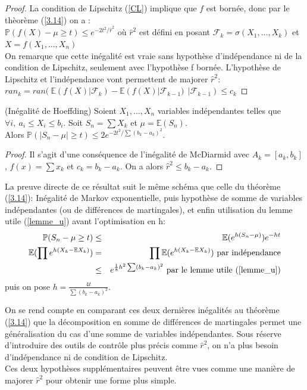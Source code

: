 \begin{proof} La condition de Lipschitz (\ref{CL}) implique que $f$ est bornée, donc par le thèorème (\ref{3.14}) on a :\\
$\mathbb{P}(f(X)-\mu \geq t) \leq e^{-2t^2/\hat r^2}$ où $\hat r^2$ est défini en posant $\mathcal{F}_k=\sigma(X_1,...,X_k)$ et $X=f(X_1,...,X_n)$\\
On remarque que cette inégalité est vraie sans hypothèse d'indépendance ni de la condition de Lipschitz, seulement avec l'hypothèse f bornée. L'hypothèse de Lipschitz et l'indépendance vont permettent de majorer $\hat r^2$:\\
$ran_k=ran(~\mathbb{E}(f(X)|\mathcal{F}_k)-\mathbb{E}(f(X)|\mathcal{F}_{k-1})~~|\mathcal{F}_{k-1}) \leq c_k$

\end{proof}


\begin{theorem} (Inégalité de Hoeffding)
Soient $X_1,...,X_n$ variables indépendantes telles que $\forall i, ~ a_i \leq X_i \leq b_i$. Soit $S_n=\sum X_k$ et $\mu=\mathbb{E}(S_n)$.\\
Alors $\mathbb{P}(|S_n-\mu| \geq t) \leq 2e^{-2t^2/\sum(b_k-a_k)^2} $.
\end{theorem}

\begin{proof}
 Il s'agit d'une conséquence de l'inégalité de McDiarmid avec $ A_k=[a_k,b_k]$, $f(x)=\sum x_k$ et $c_k=b_k-a_k $. On a alors $\hat r^2 \leq b_k-a_k$.
\end{proof}

\begin{remark} 
 La preuve directe de ce résultat suit le même schéma que celle du théorème (\ref{3.14}): Inégalité de Markov exponentielle, puis hypothèse de somme de variables indépendantes (ou de différences de martingales), et enfin utilisation du lemme utile (\ref{lemme_u}) avant l'optimisation en h:
\begin{eqnarray*} 
\mathbb{P}(S_n-\mu \geq t) &\leq& \mathbb{E}(e^{h(S_n-\mu)})e^{-ht}\\
\mathbb{E}(\prod e^{h(X_k-\mathbb{E}X_k)})&=&\prod \mathbb{E}(e^{h(X_k-\mathbb{E}X_k)})\mbox{~par indépendance}\\
&\leq& e^{\frac{1}{8}h^2\sum(b_k-a_k)^2} \mbox{~par le lemme utile (\ref{lemme_u})}
\end{eqnarray*}
puis on pose $h=\frac{4t}{\sum(b_k-a_k)^2}$.
\end{remark}

\begin{remark} 
 On se rend compte en comparant ces deux dernières inégalités au théorème (\ref{3.14}) que la décomposition en somme de différences de martingales permet une généralisation du cas d'une somme de variables indépendantes. Sous réserve d'introduire des outils de contrôle plus précis comme $\hat r^2$, on n'a plus besoin d'indépendance ni de condition de Lipschitz.\\
Ces deux hypothèses supplémentaires peuvent être vues comme une manière de majorer $\hat r^2$ pour obtenir une forme plus simple.
\end{remark}

